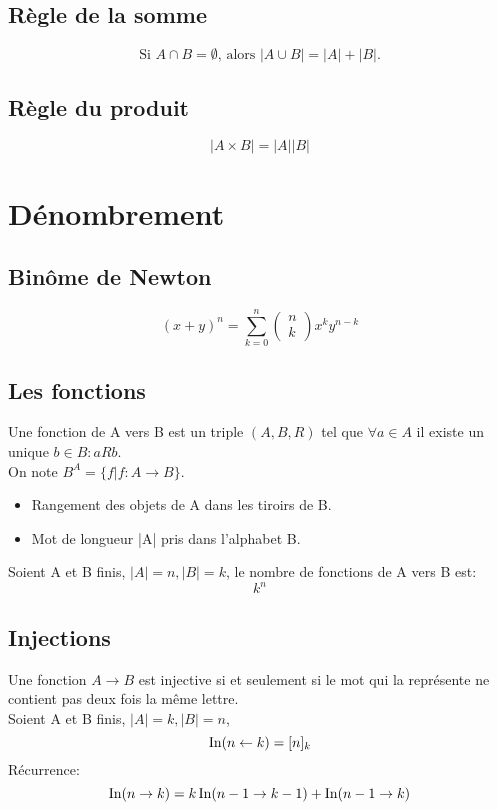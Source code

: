 \subsection{Règle de la somme}
\[\text{Si }A \cap B = \emptyset \text{, alors }|A \cup B| = |A| + |B| \text{.}\]
\subsection{Règle du produit}
\[|A \times B| = |A||B|\]
\section{Dénombrement}
\subsection{Binôme de Newton}
\[(x + y)^n = \sum_{k = 0}^n \begin{pmatrix}  n  \\ k \end{pmatrix} x^ky^{n-k}\]
\subsection{Les fonctions}
Une fonction de A vers B est un triple $(A,B,R)$ tel que $\forall a \in A$ il existe un unique $b \in B : aRb$.\\

On note $B^{A} = \{f | f : A \rightarrow B\}$.\\

\begin{itemize}
\item Rangement des objets de A dans les tiroirs de B.\\
\item Mot de longueur |A| pris dans l'alphabet B.\\
\end{itemize}
Soient A et B finis, $|A| = n , |B| = k$, le nombre de fonctions de A vers B est:
\[k^n\]

\subsection{Injections}
Une fonction $A \to B$ est injective si et seulement si le mot qui la représente ne contient pas deux fois la même lettre.\\

Soient A et B finis, $|A| = k, |B| = n$,
\[\operatorname{In}(n \leftarrow k) = [n]_k\]
Récurrence:
\[\operatorname{In}(n \to k) = k\operatorname{In}(n-1 \to k-1) + \operatorname{In}(n-1 \to k)\]

